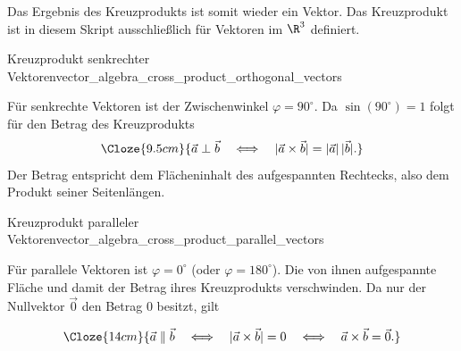 \noindent
\begin{minipage}{\linewidth}
  Das Ergebnis des Kreuzprodukts ist somit wieder ein Vektor. Das Kreuzprodukt
  ist in diesem Skript ausschließlich für Vektoren im $\R^3$ definiert.
\end{minipage}

\begin{KeyPointBox}{Kreuzprodukt senkrechter Vektoren}{vector_algebra_cross_product_orthogonal_vectors}
  \begin{minipage}[c]{0.68\linewidth}
    Für senkrechte Vektoren ist der Zwischenwinkel $\varphi=90^\circ$.
    Da $\sin(90^\circ)=1$ folgt für den Betrag des Kreuzprodukts
    \[
      \Cloze{9.5cm}{%
        \vec a\perp\vec b
        \quad\Longleftrightarrow\quad
        |\vec a\times\vec b|=|\vec a|\,|\vec b|.}
    \]
    Der Betrag entspricht dem Flächeninhalt des aufgespannten Rechtecks, also
    dem Produkt seiner Seitenlängen.
  \end{minipage}\hfill
  \begin{minipage}[c]{0.27\linewidth}
    \centering
  \end{minipage}
\end{KeyPointBox}

\begin{KeyPointBox}{Kreuzprodukt paralleler Vektoren}{vector_algebra_cross_product_parallel_vectors}
  \begin{minipage}[c]{0.68\linewidth}
    Für parallele Vektoren ist $\varphi=0^\circ$ (oder
    $\varphi=180^\circ$). Die von ihnen aufgespannte Fläche und damit der
    Betrag ihres Kreuzprodukts verschwinden. Da nur der Nullvektor $\vec 0$
    den Betrag $0$ besitzt, gilt
  \end{minipage}\hfill
  \begin{minipage}[c]{0.27\linewidth}
    \centering
  \end{minipage}
  \[
    \Cloze{14cm}{%
      \vec a\parallel\vec b
      \quad\Longleftrightarrow\quad
      |\vec a\times\vec b|=0
      \quad\Longleftrightarrow\quad
      \vec a\times\vec b=\vec 0.}
  \]
\end{KeyPointBox}

